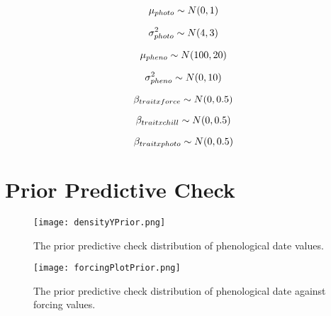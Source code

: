 \documentclass{article}
\begin{document}
\begin{equation}
\mu_{photo} \sim N(0,1)\\
\end{equation}

\begin{equation}
\sigma^2_{photo}\sim N(4,3)\\
\end{equation}

\begin{equation}
\mu_{pheno}  \sim N(100,20)\\
\end{equation}

\begin{equation}
\sigma^2_{pheno}  \sim N(0,10)\\
\end{equation}

\begin{equation}
\beta_{trait x force} \sim N(0, 0.5)\\
\end{equation}

\begin{equation}
\beta_{trait x chill} \sim N(0, 0.5)\\
\end{equation}

\begin{equation}
\beta_{trait x photo} \sim N(0, 0.5)\\ 
\end{equation}



\section{Prior Predictive Check}


\begin{figure}[h!]
  \texttt{[image: densityYPrior.png]}%
  \caption{The prior predictive check distribution of phenological date values. }
  \label{fig:densityYPrior}
\end{figure}

\begin{figure}[h!]
  \texttt{[image: forcingPlotPrior.png]}%
  \caption{The prior predictive check distribution of phenological date against forcing values. }
  \label{fig:forcingPlotPrior}
\end{figure}
\end{document}
